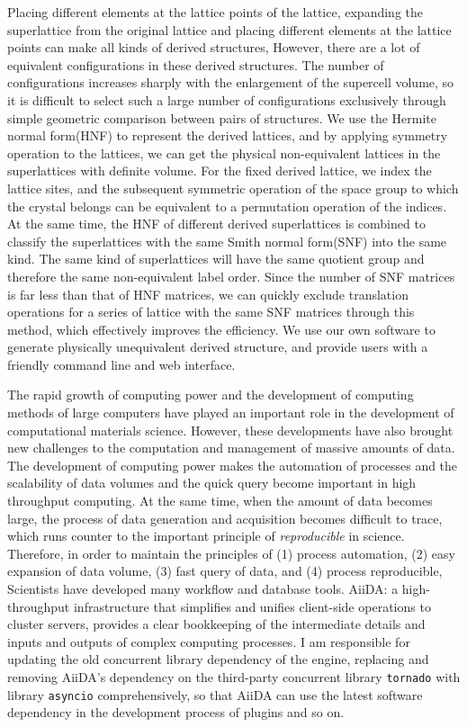 \documentclass[phd,nobackinfo]{scutthesis}
\begin{document}
\begin{englishabstract}
Placing different elements at the lattice points of the lattice, expanding the superlattice from the original lattice and placing different elements at the lattice points can make all kinds of derived structures,
However, there are a lot of equivalent configurations in these derived structures.
The number of configurations increases sharply with the enlargement of the supercell volume, so it is difficult to select such a large number of configurations exclusively through simple geometric comparison between pairs of structures.
We use the Hermite normal form(HNF) to represent the derived lattices, and by applying symmetry operation to the lattices, we can get the physical non-equivalent lattices in the superlattices with definite volume. For the fixed derived lattice, we index the lattice sites, and the subsequent symmetric operation of the space group to which the crystal belongs can be equivalent to a permutation operation of the indices. 
At the same time, the HNF of different derived superlattices is combined to classify the superlattices with the same Smith normal form(SNF) into the same kind. The same kind of superlattices will have the same quotient group and therefore the same non-equivalent label order. 
Since the number of SNF matrices is far less than that of HNF matrices, we can quickly exclude translation operations for a series of lattice with the same SNF matrices through this method, which effectively improves the efficiency.
We use our own software to generate physically unequivalent derived structure, and provide users with a friendly command line and web interface.

The rapid growth of computing power and the development of computing methods of large computers have played an important role in the development of computational materials science.
However, these developments have also brought new challenges to the computation and management of massive amounts of data.
The development of computing power makes the automation of processes and the scalability of data volumes and the quick query become important in high throughput computing.
At the same time, when the amount of data becomes large, the process of data generation and acquisition becomes difficult to trace, which runs counter to the important principle of \textit{reproducible} in science.
Therefore, in order to maintain the principles of (1) process automation, (2) easy expansion of data volume, (3) fast query of data, and (4) process reproducible,
Scientists have developed many workflow and database tools. 
AiiDA: a high-throughput infrastructure that simplifies and unifies client-side operations to cluster servers, provides a clear bookkeeping of the intermediate details and inputs and outputs of complex computing processes.
I am responsible for updating the old concurrent library dependency of the engine, replacing and removing AiiDA's dependency on the third-party concurrent library \texttt{tornado} with library \texttt{asyncio} comprehensively, so that AiiDA can use the latest software dependency in the development process of plugins and so on.


\end{englishabstract}
\end{document}
